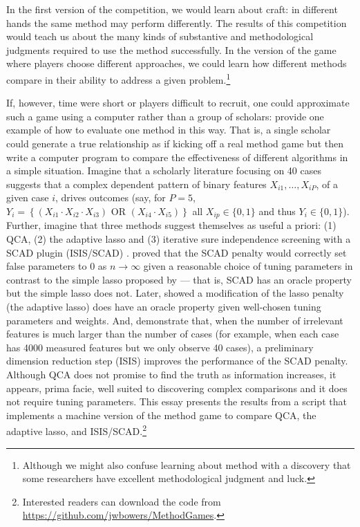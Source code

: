 \documentclass[12pt]{article}
\begin{document}
In the first version of the competition, we would learn about craft: in
different hands the same method may perform differently. The results of this
competition would teach us about the many kinds of substantive and
methodological judgments required to use the method
successfully.  In the version of the game where players choose different
approaches, we could learn how different methods compare in their ability to
address a given problem.\footnote{Although we might also confuse learning
  about method with a discovery that some researchers have excellent
  methodological judgment and luck.}

If, however, time were short or players difficult to recruit, one could
approximate such a game using a computer rather than a group of scholars:
\cite{lucasfk2014} provide one example of how to evaluate one method in
this way. That is, a single scholar could generate a true relationship as if
kicking off a real method game but then write a computer program to compare
the effectiveness of different algorithms in a simple situation. Imagine that
a scholarly literature focusing on 40 cases suggests that a complex dependent
pattern of binary features $X_{i1}, \ldots, X_{iP}$, of a given case $i$,
drives outcomes (say, for $P=5$, $Y_i= \left\{ (X_{i1} \cdot X_{i2} \cdot
  X_{i3} ) \text{ OR } ( X_{i4} \cdot X_{i5}) \right\}$ all $X_{ip}  \in
\{0,1\}$ and thus $Y_i \in \{0,1\}$).  Further, imagine that three methods
suggest themselves as useful a priori: (1) QCA, (2) the adaptive lasso and (3)
iterative sure independence screening with a SCAD plugin (ISIS/SCAD)
\citep{fan2008sure}.  \citet{fan2001variable} proved that the SCAD penalty
would correctly set false parameters to 0 as $n \rightarrow \infty$ given a
reasonable choice of tuning parameters in contrast to the simple lasso
proposed by \cite{tibshirani1996regression} --- that is, SCAD has an oracle
property but the simple lasso does not. Later, \citet{zou2006adaptive} showed
a modification of the lasso penalty (the adaptive lasso) does have an oracle
property given well-chosen tuning parameters and weights.  And,
\citet{fan2008sure} demonstrate that, when the number of irrelevant features
is much larger than the number of cases (for example, when each case has 4000
measured features but we only observe 40 cases), a preliminary dimension
reduction step (ISIS) improves the performance of the SCAD penalty.  Although
QCA does not promise to find the truth as information increases, it appears,
prima facie, well suited to discovering complex comparisons and it does not
require tuning parameters. This essay presents the results from a script that
implements a machine version of the method game to compare QCA, the adaptive
lasso, and ISIS/SCAD.\footnote{Interested readers can download the code from
  \url{https://github.com/jwbowers/MethodGames}.}
\end{document}
